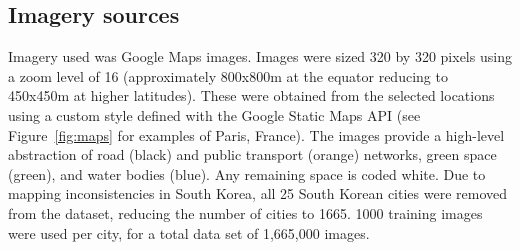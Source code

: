 \documentclass[final,3p,times,authoryear]{elsarticle}
\begin{document}
\subsection{Imagery sources}\label{methodsimagery}
Imagery used was Google Maps images. Images were sized 320 by 320 pixels using a zoom level of 16 (approximately 800x800m at the equator reducing to 450x450m at higher latitudes). These were obtained from the selected locations using a custom style defined with the Google Static Maps API \citep{GoogleStatic2017} (see Figure~\ref{fig:maps} for examples of Paris, France). The images provide a high-level abstraction of road (black) and public transport (orange) networks, green space (green), and water bodies (blue). Any remaining space is coded white. Due to mapping inconsistencies in South Korea, all 25 South Korean cities were removed from the dataset, reducing the number of cities to 1665. 1000 training images were used per city, for a total data set of 1,665,000 images. 
\end{document}

